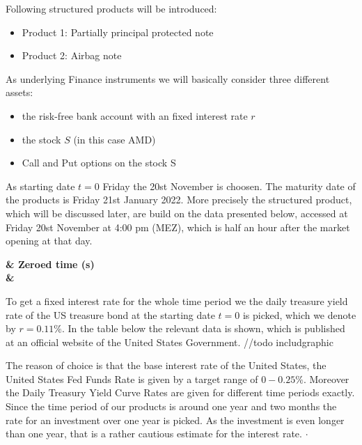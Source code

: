 \documentclass[11pt,oneside,a4paper]{article}
\begin{document}
	Following structured products will be introduced:
	\begin{itemize}
		\item Product 1: Partially principal protected note
		\item Product 2: Airbag note
	\end{itemize}
	As underlying Finance instruments we will basically consider three different assets:
	\begin{itemize}
		\item the risk-free bank account with an fixed interest rate $r$
		\item the stock $ S $ (in this case AMD)
		\item Call and Put options on the stock S
	\end{itemize}
	As starting date $ t=0 $ Friday the 20st November is choosen.
	The maturity date of the products is Friday 21st January 2022.
	More precisely the structured product, which will be discussed later, are build on the data presented below, accessed at Friday 20st November at 4:00 pm (MEZ), which is half an hour after the market opening at that day. \\
    \begin{tabular}%
		\bfseries  & \bfseries Zeroed time (s)%
		{\\\hline\csvcoli&\csvcolii}%
    \end{tabular}
	To get a fixed interest rate for the whole time period we the daily treasure yield rate of the US treasure bond at the starting date $ t=0 $ is picked, which we denote by $ r = 0.11 \% $.
	In the table below the relevant data is shown, which is published at \cite{site_treasure}
    an official website of the United States Government.
	//todo includgraphic 
	
	The reason of choice is that the base interest rate of the United States, the United States Fed Funds Rate is given by a target range of $ 0-0.25 \% $. Moreover the Daily Treasury Yield Curve Rates are given for different time periods exactly. Since the time period of our products is around one year and two months the rate for an investment over one year is picked. As the investment is even longer than one year, that is a rather cautious estimate for the interest rate.
	$\cdot$
	\newpage
\end{document}
